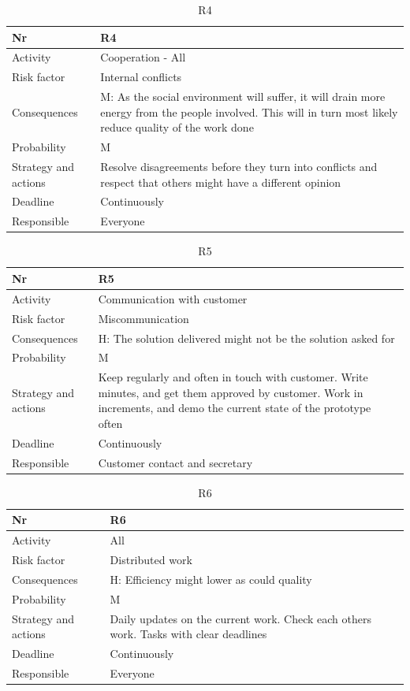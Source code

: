 \documentclass[11pt]{book}
\begin{document}
\begin{table}[H]
\centering
\begin{tabular}{ l  p{11cm} }
Nr & R4\\
\hline
Activity & Cooperation - All\\
\hline
Risk factor & Internal conflicts\\
\hline
Consequences & M: As the social environment will suffer, it will drain more energy from the people involved. This will in turn most likely reduce quality of the work done\\
\hline
Probability & M\\
\hline
Strategy and actions & Resolve disagreements before they turn into conflicts and respect that others might have a different opinion\\
\hline
Deadline & Continuously\\
\hline
Responsible & Everyone\\

\end{tabular}
\label{tab:risk_4}
\caption{R4}
\end{table}

\begin{table}[H]
\centering
\begin{tabular}{ l  p{11cm} }
Nr & R5\\
\hline
Activity & Communication with customer\\
\hline
Risk factor & Miscommunication\\
\hline
Consequences & H: The solution delivered might not be the solution asked for\\
\hline
Probability & M\\
\hline
Strategy and actions & Keep regularly and often in touch with customer. Write minutes, and get them approved by customer. Work in increments, and demo the current state of the prototype often\\
\hline
Deadline & Continuously\\
\hline
Responsible & Customer contact and secretary\\

\end{tabular}
\label{tab:risk_5}
\caption{R5}
\end{table}

\begin{table}[H]
\centering
\begin{tabular}{ l  p{11cm} }
Nr & R6\\
\hline
Activity & All\\
\hline
Risk factor & Distributed work\\
\hline
Consequences & H: Efficiency might lower as could quality\\
\hline
Probability & M\\
\hline
Strategy and actions & Daily updates on the current work. Check each others work. Tasks with clear deadlines\\
\hline
Deadline & Continuously\\
\hline
Responsible & Everyone\\

\end{tabular}
\label{tab:risk_6}
\caption{R6}
\end{table}
\end{document}
